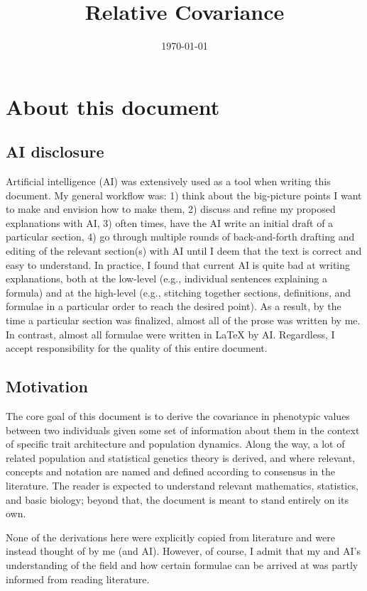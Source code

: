\documentclass[12pt]{article}
\title{Relative Covariance}
\date{\today}
\numberwithin{equation}{section}
\begin{document}
\maketitle

\setcounter{section}{-1} %
\section{About this document}
\subsection{AI disclosure}
Artificial intelligence (AI) was extensively used as a tool when writing this document.
My general workflow was: 1) think about the big-picture points I want to make and envision how to make them, 2) discuss and refine my proposed explanations with AI, 3) often times, have the AI write an initial draft of a particular section, 4) go through multiple rounds of back-and-forth drafting and editing of the relevant section(s) with AI until I deem that the text is correct and easy to understand.
In practice, I found that current AI is quite bad at writing explanations, both at the low-level (e.g., individual sentences explaining a formula) and at the high-level (e.g., stitching together sections, definitions, and formulae in a particular order to reach the desired point).
As a result, by the time a particular section was finalized, almost all of the prose was written by me.
In contrast, almost all formulae were written in LaTeX by AI.
Regardless, I accept responsibility for the quality of this entire document.

\subsection{Motivation}
The core goal of this document is to derive the covariance in phenotypic values between two individuals given some set of information about them in the context of specific trait architecture and population dynamics.
Along the way, a lot of related population and statistical genetics theory is derived, and where relevant, concepts and notation are named and defined according to consensus in the literature.
The reader is expected to understand relevant mathematics, statistics, and basic biology; beyond that, the document is meant to stand entirely on its own.

None of the derivations here were explicitly copied from literature and were instead thought of by me (and AI).
However, of course, I admit that my and AI's understanding of the field and how certain formulae can be arrived at was partly informed from reading literature. 
\end{document}
